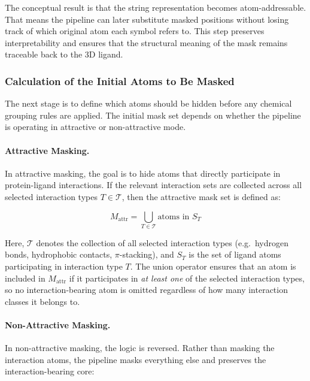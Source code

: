 \documentclass[a4paper,12pt]{article}
\begin{document}
The conceptual result is that the string representation becomes
atom-addressable. That means the pipeline can later substitute masked
positions without losing track of which original atom each symbol refers to.
This step preserves interpretability and ensures that the structural meaning of the mask remains traceable back to the 3D ligand.

\subsubsection{Calculation of the Initial Atoms to Be Masked}

The next stage is to define which atoms should be hidden before any chemical
grouping rules are applied. The initial mask set depends on whether the pipeline
is operating in attractive or non-attractive mode.

\paragraph{Attractive Masking.}
In attractive masking, the goal is to hide atoms that directly participate in
protein-ligand interactions. If the relevant interaction sets are collected
across all selected interaction types $T \in \mathcal{T}$, then the attractive
mask set is defined as:

\begin{equation}
    M_{\text{attr}} = \bigcup_{T \in \mathcal{T}} \text{atoms in } S_T
    \label{eq:attractive_mask}
\end{equation}

\noindent
Here, $\mathcal{T}$ denotes the collection of all selected interaction types
(e.g.\ hydrogen bonds, hydrophobic contacts, $\pi$-stacking), and $S_T$ is the
set of ligand atoms participating in interaction type $T$. The union operator
ensures that an atom is included in $M_{\text{attr}}$ if it participates in
\emph{at least one} of the selected interaction types, so no interaction-bearing
atom is omitted regardless of how many interaction classes it belongs to.

\paragraph{Non-Attractive Masking.}
In non-attractive masking, the logic is reversed. Rather than masking the
interaction atoms, the pipeline masks everything else and preserves the
interaction-bearing core:
\end{document}
